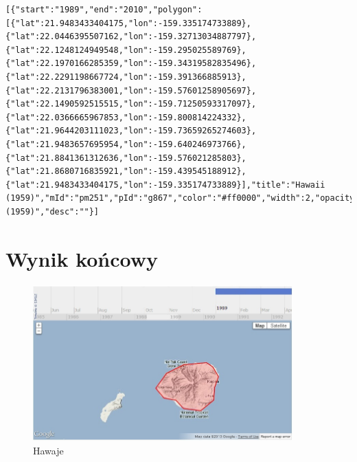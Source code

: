 \lstset{language=XML}
\begin{lstlisting}[caption=Zapis w Storage]
[{"start":"1989","end":"2010","polygon":[{"lat":21.9483433404175,"lon":-159.335174733889},{"lat":22.0446395507162,"lon":-159.32713034887797},{"lat":22.1248124949548,"lon":-159.295025589769},{"lat":22.1970166285359,"lon":-159.34319582835496},{"lat":22.2291198667724,"lon":-159.391366885913},{"lat":22.2131796383001,"lon":-159.57601258905697},{"lat":22.1490592515515,"lon":-159.71250593317097},{"lat":22.0366665967853,"lon":-159.800814224332},{"lat":21.9644203111023,"lon":-159.73659265274603},{"lat":21.9483657695954,"lon":-159.640246973766},{"lat":21.8841361312636,"lon":-159.576021285803},{"lat":21.8680716835921,"lon":-159.439545188912},{"lat":21.9483433404175,"lon":-159.335174733889}],"title":"Hawaii (1959)","mId":"pm251","pId":"g867","color":"#ff0000","width":2,"opacity":0.59765625,"fillcolor":"#ff7f7f","name":"Hawaii (1959)","desc":""}]
\end{lstlisting}

\section{Wynik końcowy}
\label{sec:aresult}

\begin{figure}[H]
  \centering
    \includegraphics[width=100mm]{ge/hawaii.jpg}
  \caption{Hawaje}
  \label{fig:hawaii}
\end{figure}
